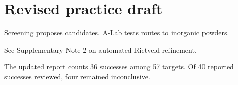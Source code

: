 \documentclass{article}
\begin{document}
\section*{Revised practice draft}
Screening proposes candidates. A-Lab tests routes to inorganic powders.

See Supplementary Note 2 on automated Rietveld refinement.

The updated report counts 36 successes among 57 targets. Of 40 reported successes reviewed, four remained inconclusive.
\end{document}
